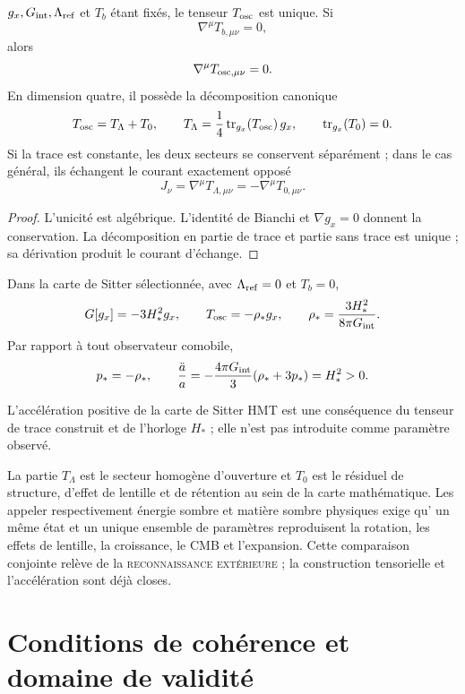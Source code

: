 \begin{theorem}
\label{thm:hmtf2-tensor-oscuro}
\(g_x,G_{\rm int},\Lambda_{\rm ref}\) et \(T_b\) étant fixés, le tenseur
\(T_{\rm osc}\) est unique. Si
\[
 \nabla^\mu T_{b,\mu\nu}=0,
 \]
alors
\[
 \nabla^\mu T_{{\rm osc},\mu\nu}=0.
\]
En dimension quatre, il possède la décomposition canonique
\[
 T_{\rm osc}=T_\Lambda+T_0,\qquad
 T_\Lambda=\frac14\operatorname{tr}_{g_x}(T_{\rm osc})\,g_x,\qquad
 \operatorname{tr}_{g_x}(T_0)=0.
\]
Si la trace est constante, les deux secteurs se conservent séparément ; dans le
cas général, ils échangent le courant exactement opposé
\[
 J_\nu=\nabla^\mu T_{\Lambda,\mu\nu}
 =-\nabla^\mu T_{0,\mu\nu}.
\]
\end{theorem}

\begin{proof}
L'unicité est algébrique. L'identité de Bianchi et
\(\nabla g_x=0\) donnent la conservation. La décomposition en partie de trace et
partie sans trace est unique ; sa dérivation produit le courant d'échange.
\end{proof}

Dans la carte de Sitter sélectionnée, avec
\(\Lambda_{\rm ref}=0\) et \(T_b=0\),
\[
 G[g_x]=-3H_*^2g_x,\qquad
 T_{\rm osc}=-\rho_*g_x,\qquad
 \rho_*=\frac{3H_*^2}{8\pi G_{\rm int}}.
\]
Par rapport à tout observateur comobile,
\[
 p_*=-\rho_*,
 \qquad
 \frac{\ddot a}{a}
 =-\frac{4\pi G_{\rm int}}3(\rho_*+3p_*)=H_*^2>0.
\]

\begin{corollary}
\label{cor:hmtf2-aceleracion}
L'accélération positive de la carte de Sitter HMT est une conséquence du
tenseur de trace construit et de l'horloge \(H_*\) ; elle n'est pas introduite comme
paramètre observé.
\end{corollary}

La partie \(T_\Lambda\) est le secteur homogène d'ouverture et \(T_0\) est le
résiduel de structure, d'effet de lentille et de rétention au sein de la carte mathématique.
Les appeler respectivement énergie sombre et matière sombre physiques exige qu'
un même état et un unique ensemble de paramètres reproduisent la rotation,
les effets de lentille, la croissance, le CMB et l'expansion. Cette comparaison conjointe relève de la
\textsc{reconnaissance extérieure} ; la construction tensorielle et l'accélération
sont déjà closes.

\section{Conditions de cohérence et domaine de validité}
\label{sec:hmtf2-falsadores}

